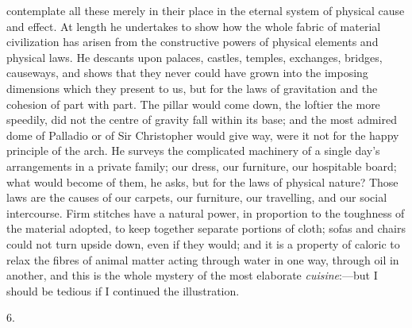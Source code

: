 contemplate all these merely in their place in the eternal system of
physical cause and effect. At length he undertakes to show how the
whole fabric of material civilization has arisen from the constructive
powers of physical elements and physical laws. He descants upon
palaces, castles, temples, exchanges, bridges, causeways, and shows
that they never could have grown into the imposing dimensions which
they present to us, but for the laws of gravitation and the cohesion
of part with part. The pillar would come down, the loftier the more
speedily, did not the centre of gravity fall within its base; and the
most admired dome of Palladio or of Sir Christopher would give way,
were it not for the happy principle of the arch. He surveys the
complicated machinery of a single day's arrangements in a private
family; our dress, our furniture, our hospitable board; what would
become of them, he asks, but for the laws of physical nature? Those
laws are the causes of our carpets, our furniture, our travelling, and
our social intercourse. Firm stitches have a natural power, in
proportion to the toughness of the material adopted, to keep together
separate portions of cloth; sofas and chairs could not turn upside
down, even if they would; and it is a property of caloric to relax the
fibres of animal matter acting through water in one way, through oil
in another, and this is the whole mystery of the most elaborate \emph{cuisine}:—but
I should be tedious if I continued the illustration.

6.

